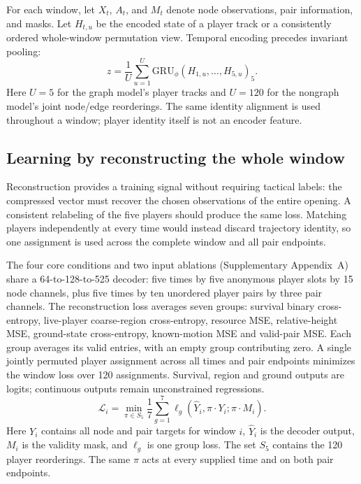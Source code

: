 For each window, let $X_t$, $A_t$, and $M_t$ denote node observations, pair information, and masks. Let $H_{t,u}$ be the encoded state of a player track or a consistently ordered whole-window permutation view. Temporal encoding precedes invariant pooling:
\begin{equation}
 z=\frac{1}{U}\sum_{u=1}^{U}\mathrm{GRU}_{\phi}(H_{1,u},\ldots,H_{5,u})_5.
\end{equation}
Here $U=5$ for the graph model's player tracks and $U=120$ for the nongraph model's joint node/edge reorderings. The same identity alignment is used throughout a window; player identity itself is not an encoder feature. %

\subsection{Learning by reconstructing the whole window}
Reconstruction provides a training signal without requiring tactical labels: the compressed vector must recover the chosen observations of the entire opening. A consistent relabeling of the five players should produce the same loss. Matching players independently at every time would instead discard trajectory identity, so one assignment is used across the complete window and all pair endpoints.

The four core conditions and two input ablations (Supplementary Appendix~A) share a 64-to-128-to-525 decoder: five times by five anonymous player slots by 15 node channels, plus five times by ten unordered player pairs by three pair channels. The reconstruction loss averages seven groups: survival binary cross-entropy, live-player coarse-region cross-entropy, resource MSE, relative-height MSE, ground-state cross-entropy, known-motion MSE and valid-pair MSE. Each group averages its valid entries, with an empty group contributing zero. A single jointly permuted player assignment across all times and pair endpoints minimizes the window loss over 120 assignments. Survival, region and ground outputs are logits; continuous outputs remain unconstrained regressions. %
\begin{equation}
 \mathcal{L}_i=\min_{\pi\in S_5}\frac{1}{7}
 \sum_{g=1}^{7}\ell_g(\widehat{Y}_i,\pi\!\cdot\!Y_i;\pi\!\cdot\!M_i).
\end{equation}
Here $Y_i$ contains all node and pair targets for window $i$, $\widehat{Y}_i$ is the decoder output, $M_i$ is the validity mask, and $\ell_g$ is one group loss. The set $S_5$ contains the 120 player reorderings. The same $\pi$ acts at every supplied time and on both pair endpoints.

